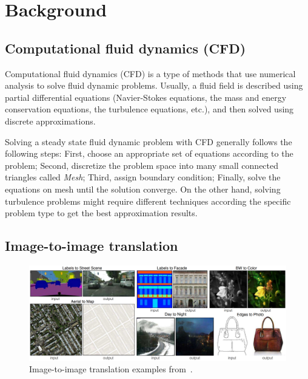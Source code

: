 \section{Background}

\subsection{Computational fluid dynamics (CFD)}

Computational fluid dynamics (CFD) is a type of methods that use numerical 
analysis to solve fluid dynamic problems. 
Usually, a fluid field is described using partial differential equations 
(Navier-Stokes equations, the mass and energy conservation equations, the 
turbulence equations, etc.), and then solved using discrete approximations. 

Solving a steady state fluid dynamic problem with CFD generally follows the 
following steps: 
First, choose an appropriate set of equations according to the problem;
Second, discretize the problem space into many small connected triangles called 
\textit{Mesh}; 
Third, assign boundary condition;
Finally, solve the equations on mesh until the solution converge.
On the other hand, solving turbulence problems might require different 
techniques according the specific problem type to get the best approximation 
results. 

\subsection{Image-to-image translation}

\begin{figure}[htp]
    \centering
    \includegraphics[width=\textwidth]{pix2pix.png}
    \caption{Image-to-image translation examples from~\cite{isola2017image}.}
    \label{fig:pix2pix}
\end{figure}

